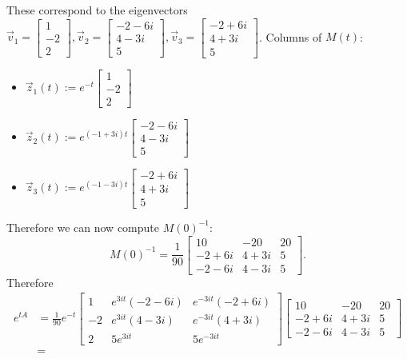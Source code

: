 \documentclass[12pt, letterpaper]{article}
\begin{document}
\begin{enumerate}
		These correspond to the eigenvectors $\Vec{v}_1 = \begin{bmatrix}1 \\ -2 \\ 2 \end{bmatrix}, \Vec{v}_2 = \begin{bmatrix} -2-6i \\ 4-3i\\ 5\end{bmatrix}, \Vec{v}_3 = \begin{bmatrix}-2 + 6i\\4+3i\\5	\end{bmatrix}$.  Columns of $M(t)$:
		\begin{itemize}
			\item $\Vec{z}_1(t) := e^{-t}\begin{bmatrix} 1 \\ -2 \\ 2\end{bmatrix}$
			\item $\Vec{z}_2(t) := e^{(-1+3i)t}\begin{bmatrix} -2-6i \\ 4-3i\\ 5\end{bmatrix}$
			\item $\Vec{z}_3(t) := e^{(-1-3i)t}\begin{bmatrix} -2+6i \\ 4+3i\\ 5\end{bmatrix}$
		\end{itemize}
		Therefore we can now compute $M(0)^{-1}$: 
		$$
			M(0)^{-1} = \frac{1}{90}  \begin{bmatrix} 10 & -20 & 20\\
			-2+6i & 4 + 3i & 5\\
			-2 -6i & 4-3i & 5 \end{bmatrix}.
		$$
		Therefore 
		\begin{align*}		
		e^{tA} &= \frac{1}{90} e^{-t} \begin{bmatrix}
	1 & e^{3it} (-2-6i) &e^{-3it} (-2+6i)\\
	-2 & e^{3it} (4-3i) & e^{-3it} (4+3i)\\
	2 &   5e^{3it} & 5e^{-3it}  	
\end{bmatrix} \begin{bmatrix} 10 & -20 & 20\\
			-2+6i & 4 + 3i & 5\\
			-2 -6i & 4-3i & 5 \end{bmatrix}\\ &= 			

\end{align*}
\end{enumerate}
\end{document}
